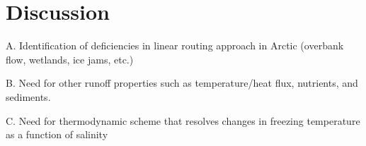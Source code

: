 \section{Discussion}

A.	Identification of deficiencies in linear routing approach in Arctic (overbank flow, wetlands, ice jams, etc.)

B.	Need for other runoff properties such as temperature/heat flux, nutrients, and sediments.

C.	Need for thermodynamic scheme that resolves changes in freezing temperature as a function of salinity

  